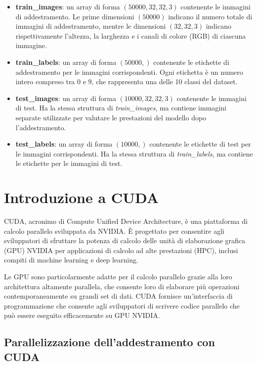 \documentclass{article}
\begin{document}
\begin{itemize}
    \item \textbf{train\_images}: un array di forma $(50000, 32, 32, 3)$ contenente le immagini di addestramento. Le prime dimensioni $(50000)$ indicano il numero totale di immagini di addestramento, mentre le dimensioni $(32, 32, 3)$ indicano rispettivamente l'altezza, la larghezza e i canali di colore (RGB) di ciascuna immagine.
    
    \item \textbf{train\_labels}: un array di forma $(50000, )$ contenente le etichette di addestramento per le immagini corrispondenti. Ogni etichetta è un numero intero compreso tra 0 e 9, che rappresenta una delle 10 classi del dataset.
    
    \item \textbf{test\_images}: un array di forma $(10000, 32, 32, 3)$ contenente le immagini di test. Ha la stessa struttura di \textit{train\_images}, ma contiene immagini separate utilizzate per valutare le prestazioni del modello dopo l'addestramento.
    
    \item \textbf{test\_labels}: un array di forma $(10000, )$ contenente le etichette di test per le immagini corrispondenti. Ha la stessa struttura di \textit{train\_labels}, ma contiene le etichette per le immagini di test.
\end{itemize}

\section{Introduzione a CUDA}

CUDA, acronimo di Compute Unified Device Architecture, è una piattaforma di calcolo parallelo sviluppata da NVIDIA. È progettato per consentire agli sviluppatori di sfruttare la potenza di calcolo delle unità di elaborazione grafica (GPU) NVIDIA per applicazioni di calcolo ad alte prestazioni (HPC), inclusi compiti di machine learning e deep learning.

Le GPU sono particolarmente adatte per il calcolo parallelo grazie alla loro architettura altamente parallela, che consente loro di elaborare più operazioni contemporaneamente su grandi set di dati. CUDA fornisce un'interfaccia di programmazione che consente agli sviluppatori di scrivere codice parallelo che può essere eseguito efficacemente su GPU NVIDIA.

\subsection{Parallelizzazione dell'addestramento con CUDA}
\end{document}

